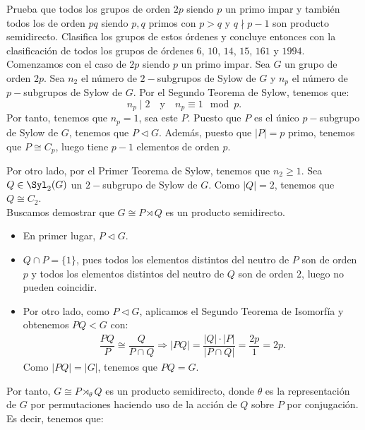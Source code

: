 \newpage
\begin{ejercicio}
    Prueba que todos los grupos de orden \(2p\) siendo \(p\) un primo impar y también todos los de orden \(pq\) siendo \(p, q\) primos con \(p > q\) y \(q \nmid p - 1\) son producto semidirecto. Clasifica los grupos de estos órdenes y concluye entonces con la clasificación de todos los grupos de órdenes \(6\), \(10\), \(14\), \(15\), \(161\) y \(1994\).\\

    Comenzamos con el caso de \(2p\) siendo \(p\) un primo impar. Sea \(G\) un grupo de orden \(2p\). Sea $n_2$ el número de \(2-\)subgrupos de Sylow de \(G\) y $n_p$ el número de \(p-\)subgrupos de Sylow de \(G\). Por el Segundo Teorema de Sylow, tenemos que:
    \begin{equation*}
        n_p\mid 2 \quad \text{y} \quad n_p \equiv 1 \mod p.
    \end{equation*}
    Por tanto, tenemos que \(n_p = 1\), sea este $P$. Puesto que $P$ es el único \(p-\)subgrupo de Sylow de \(G\), tenemos que \(P\lhd G\). Además, puesto que $|P|=p$ primo, tenemos que $P\cong C_p$, luego tiene $p-1$ elementos de orden \(p\).

    Por otro lado, por el Primer Teorema de Sylow, tenemos que $n_2\geq 1$. Sea $Q\in \Syl_2(G)$ un \(2-\)subgrupo de Sylow de \(G\). Como $|Q|=2$, tenemos que \(Q\cong C_2\).\\
        
    Buscamos demostrar que $G\cong P\rtimes Q$ es un producto semidirecto.
    \begin{itemize}
        \item En primer lugar, $P\lhd G$.
        \item $Q\cap P = \{1\}$, pues todos los elementos distintos del neutro de \(P\) son de orden \(p\) y todos los elementos distintos del neutro de \(Q\) son de orden \(2\), luego no pueden coincidir.
        \item Por otro lado, como $P\lhd G$, aplicamos el Segundo Teorema de Isomorfía y obtenemos $PQ<G$ con:
        \begin{align*}
            \dfrac{PQ}{P} \cong \dfrac{Q}{P\cap Q}
            \Longrightarrow
            |PQ| = \dfrac{|Q|\cdot |P|}{|P\cap Q|}
            = \dfrac{2p}{1} = 2p.
        \end{align*}
        Como $|PQ| = |G|$, tenemos que \(PQ=G\).
    \end{itemize}
    Por tanto, $G\cong P\rtimes_{\theta} Q$ es un producto semidirecto, donde $\theta$ es la representación de $G$ por permutaciones haciendo uso de la acción de \(Q\) sobre \(P\) por conjugación. Es decir, tenemos que:



\end{ejercicio}
